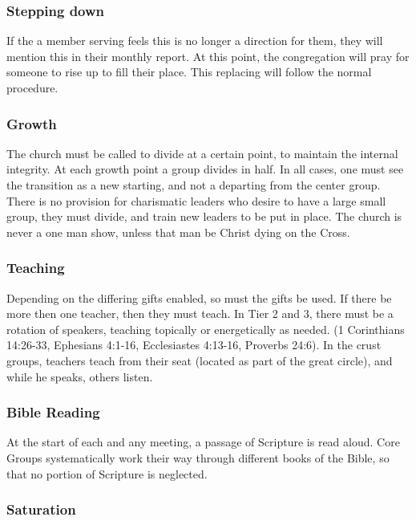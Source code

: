 \documentclass[CSHFoundation.tex]{subfiles}
\begin{document}
\subsubsection{Stepping down}

If the a member serving feels this is no longer a direction for them, they will mention this in their monthly report. At this point, the congregation will pray for someone to rise up to fill their place. This replacing will follow the normal procedure.



\subsubsection{Growth}

The church must be called to divide at a certain point, to maintain the internal integrity. At each growth point a group divides in half. In all cases, one must see the transition as a new starting, and not a departing from the center group. There is no provision for charismatic leaders who desire to have a large small group, they must divide, and train new leaders to be put in place. The church is never a one man show, unless that man be Christ dying on the Cross.



\subsubsection{Teaching}

Depending on the differing gifts enabled, so must the gifts be used. If there be more then one teacher, then they must teach. In Tier 2 and 3, there must be a rotation of speakers, teaching topically or energetically as needed. (1 Corinthians 14:26-33, Ephesians 4:1-16, Ecclesiastes 4:13-16, Proverbs 24:6). In the crust groups, teachers teach from their seat (located as part of the great circle), and while he speaks, others listen.



\subsubsection{Bible Reading}

At the start of each and any meeting, a passage of Scripture is read aloud. Core Groups systematically work their way through different books of the Bible, so that no portion of Scripture is neglected.

\subsubsection{Saturation}
\end{document}
